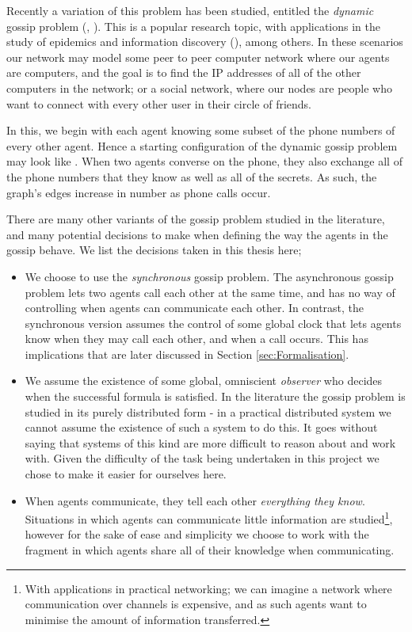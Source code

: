 \documentclass[10pt, a4paper]{report}
\begin{document}
Recently a variation of this problem has been studied, entitled the
\emph{dynamic} gossip problem (\cite{DynamicGossip}, \cite{EpProforDyGo}). This
is a popular research topic, with applications in the study of epidemics and
information discovery (\cite{DiscoverythruGossip}), among others. In these
scenarios our network may model some peer to peer computer network where our
agents are computers, and the goal is to find the IP addresses of all of the
other computers in the network; or a social network, where our nodes are people
who want to connect with every other user in their circle of friends.

In this, we begin with each agent knowing some subset of the phone
numbers of every other agent. Hence a starting configuration of the dynamic
gossip problem may look like . When two agents
converse on the phone, they also exchange all of the phone numbers that they
know as well as all of the secrets. As such, the graph's edges increase in
number as phone calls occur.

There are many other variants of the gossip problem studied in the literature,
and many potential decisions to make when defining the way the agents in the
gossip behave. We list the decisions taken in this thesis here;

\begin{itemize}
  \setlength\itemsep{1em}
  \item We choose to use the \emph{synchronous} gossip problem. The asynchronous
    gossip problem lets two agents call each other at the same time, and has no
    way of controlling when agents can communicate each other. In contrast, the
    synchronous version assumes the control of some global clock that lets
    agents know when they may call each other, and when a call occurs. This has
    implications that are later discussed in Section \ref{sec:Formalisation}.
  \item We assume the existence of some global, omniscient \emph{observer} who
    decides when the successful formula is satisfied. In the literature the
    gossip problem is studied in its purely distributed form - in a practical
    distributed system we cannot assume the existence of such a system to do
    this. It goes without saying that systems of this kind are more difficult to
    reason about and work with. Given the difficulty of the task being
    undertaken in this project we chose to make it easier for ourselves here.
  \item When agents communicate, they tell each other \emph{everything they
      know}. Situations in which agents can communicate little information are
    studied\footnote{With applications in practical networking; we can imagine a
    network where communication over channels is expensive, and as such agents
    want to minimise the amount of information transferred.}, however for the
  sake of ease and simplicity we choose to work with the fragment in which
  agents share all of their knowledge when communicating. 
\end{itemize}
\end{document}
